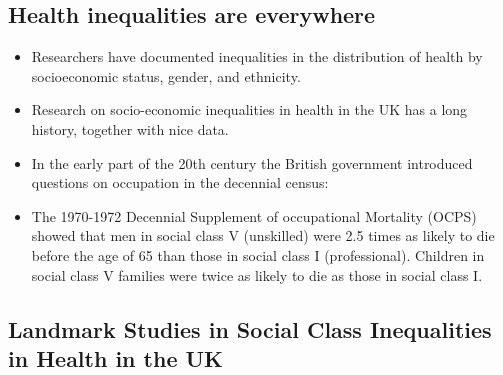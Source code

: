         
    \subsection{Health inequalities are everywhere}
    
        \begin{itemize}
            \item Researchers have documented inequalities in the distribution of health by socioeconomic status, gender, and ethnicity.
            \item Research on socio-economic inequalities in health in the UK has a long history, together with nice data.
            \item In the early part of the 20th century the British government introduced questions on occupation in the decennial census:
            \item The 1970-1972 Decennial Supplement of occupational Mortality (OCPS) showed that men in social class V (unskilled) were 2.5 times as likely to die before the age of 65 than those in social class I (professional). Children in social class V families were twice as likely to die as those in social class I.
        \end{itemize} 

    \subsection{Landmark Studies in Social Class Inequalities in Health in the UK}

